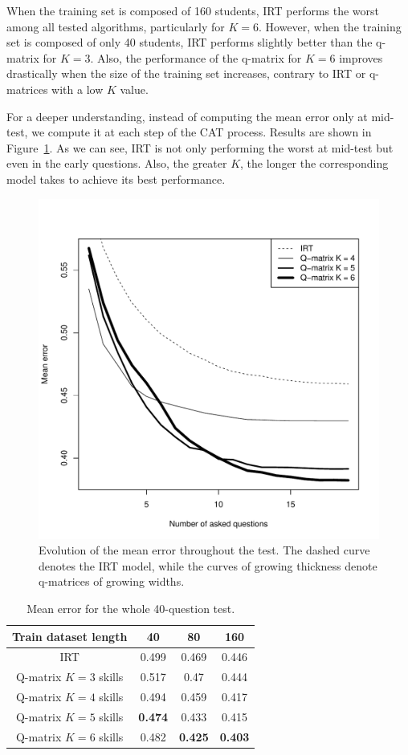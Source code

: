\documentclass{sig-alternate}
\begin{document}
When the training set is composed of 160 students, IRT performs the worst among all tested algorithms, particularly for $K = 6$. However, when the training set is composed of only 40 students, IRT performs slightly better than the q-matrix for $K = 3$. Also, the performance of the q-matrix for $K = 6$ improves drastically when the size of the training set increases, contrary to IRT or q-matrices with a low $K$ value.

For a deeper understanding, instead of computing the mean error only at mid-test, we compute it at each step of the CAT process. Results are shown in Figure~\ref{fig:1}. As we can see, IRT is not only performing the worst at mid-test but even in the early questions. Also, the greater $K$, the longer the corresponding model takes to achieve its best performance. 

\begin{figure}
\includegraphics[width=\linewidth]{20-80.pdf}
\caption{Evolution of the mean error throughout the test. The dashed curve denotes the IRT model, while the curves of growing thickness denote q-matrices of growing widths.}
\label{fig:1}
\end{figure}

\begin{table}[H]
\centering\begin{tabular}{cccc}
Train dataset length & 40 & 80 & 160\\
\hline
IRT & 0.499 & 0.469 & 0.446\\
Q-matrix $K = 3$ skills & 0.517 & 0.47 & 0.444\\
Q-matrix $K = 4$ skills & 0.494 & 0.459 & 0.417\\
Q-matrix $K = 5$ skills & \textbf{0.474} & 0.433 & 0.415\\
Q-matrix $K = 6$ skills & 0.482 & \textbf{0.425} & \textbf{0.403}\\
\end{tabular}
\caption{Mean error for the whole 40-question test.}
\label{tab:40q}
\end{table}
\end{document}
